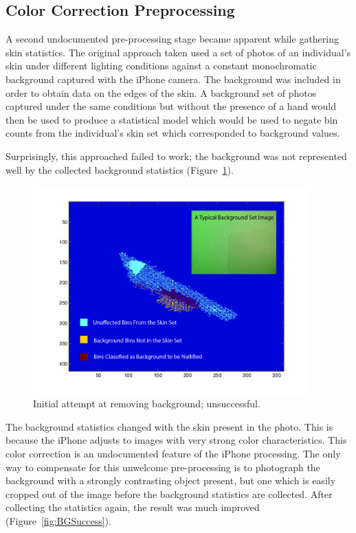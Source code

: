 \subsection{Color Correction Preprocessing}
A second undocumented pre-processing stage became apparent while gathering skin statistics. The original approach taken used a set of photos of an individual's skin  under different lighting conditions against a constant monochromatic background captured with the iPhone camera. The background was included in order to obtain data on the edges of the skin. A background set of photos captured under the same conditions but without the presence of a hand would then be used to produce a statistical model which would be used to negate bin counts from the individual's skin set which corresponded to background values.

Surprisingly, this approached failed to work; the background was not represented well by the collected background statistics (Figure~\ref{fig:BGFailure}).

\begin{figure}[h!]
  \centering
    \includegraphics[width=0.95\textwidth]{Chapter3/Figs/CaCb_bg_failed.jpg}
    \caption{Initial attempt at removing background; unsuccessful.} \label{fig:BGFailure}
\end{figure}

The background statistics changed with the skin present in the photo. This is because the iPhone adjusts to images with very strong color characteristics. This color correction is an undocumented feature of the iPhone processing. The only way to compensate for this unwelcome pre-processing is to photograph the background with a strongly contrasting object present, but one which is easily cropped out of the image before the background statistics are collected. After collecting the statistics again, the result was much improved (Figure~\ref{fig:BGSuccess}).

